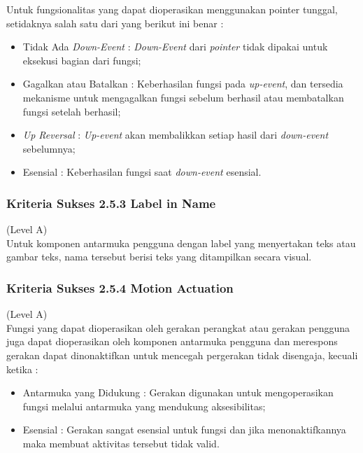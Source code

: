 \documentclass[a4paper,twoside]{article}
\begin{document}
\begin{enumerate}
		Untuk fungsionalitas yang dapat dioperasikan menggunakan pointer tunggal, setidaknya salah satu dari yang berikut ini benar :
		
		\begin{itemize}
			\item Tidak Ada \textit{Down-Event} : \textit{Down-Event} dari \textit{pointer} tidak dipakai untuk eksekusi bagian dari fungsi;
			\item Gagalkan atau Batalkan : Keberhasilan fungsi pada \textit{up-event}, dan tersedia mekanisme untuk mengagalkan fungsi sebelum berhasil atau membatalkan fungsi setelah berhasil;
			\item \textit{Up Reversal} : \textit{Up-event} akan membalikkan setiap hasil dari \textit{down-event} sebelumnya;
			\item Esensial : Keberhasilan fungsi saat \textit{down-event} esensial.
		\end{itemize}
		
		\subsubsection*{Kriteria Sukses 2.5.3 Label in Name}
		\label{subsubsec:kriteria_2.5.3}
		(Level A) \\
		
		Untuk komponen antarmuka pengguna dengan label yang menyertakan teks atau gambar teks, nama tersebut berisi teks yang ditampilkan secara visual.
		
		\subsubsection*{Kriteria Sukses 2.5.4 Motion Actuation}
		\label{subsubsec:kriteria_2.5.4}
		(Level A) \\
		
		Fungsi yang dapat dioperasikan oleh gerakan perangkat atau gerakan pengguna juga dapat dioperasikan oleh komponen antarmuka pengguna dan merespons gerakan dapat dinonaktifkan untuk mencegah pergerakan tidak disengaja, kecuali ketika :
		
		\begin{itemize}
			\item Antarmuka yang Didukung : Gerakan digunakan untuk mengoperasikan fungsi melalui antarmuka yang mendukung aksesibilitas;
			\item Esensial : Gerakan sangat esensial untuk fungsi dan jika menonaktifkannya maka membuat aktivitas tersebut tidak valid.
		\end{itemize}
		

\end{enumerate}
\end{document}
